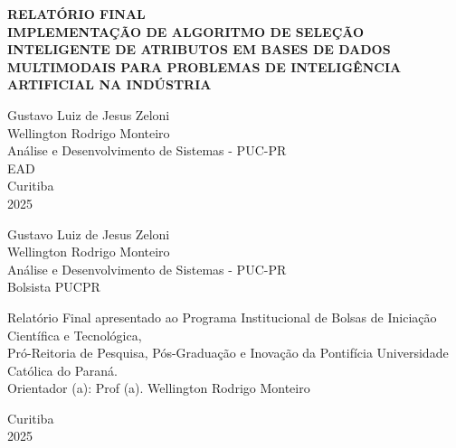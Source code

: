 \documentclass[12pt,openright,oneside,a4paper,english,brazil]{abntex2}
\begin{document}
\begin{capa}
    \cabecalhoinstitucional%

    \vspace{2cm}

    \begin{center}
        {\ABNTEXchapterfont\bfseries\LARGE RELATÓRIO FINAL}\\[1.5cm]
        {\ABNTEXchapterfont\bfseries\Large IMPLEMENTAÇÃO DE ALGORITMO DE SELEÇÃO INTELIGENTE DE ATRIBUTOS EM BASES DE DADOS MULTIMODAIS PARA PROBLEMAS DE INTELIGÊNCIA ARTIFICIAL NA INDÚSTRIA}\\[2cm]
    \end{center}

    \vfill

    \begin{flushright}
        {\large Gustavo Luiz de Jesus Zeloni}\\
        {\large Wellington Rodrigo Monteiro}\\
        {\large Análise e Desenvolvimento de Sistemas - PUC-PR}\\
        {\large EAD}\\[2cm]
        {\large Curitiba}\\
        {\large 2025}
    \end{flushright}
\end{capa}

\newpage
\thispagestyle{empty}
\cabecalhoinstitucional

\vspace{2cm}

\begin{center}
    {\large Gustavo Luiz de Jesus Zeloni}\\[0.3cm]
    {\large Wellington Rodrigo Monteiro}\\[0.3cm]
    {\large Análise e Desenvolvimento de Sistemas - PUC-PR}\\[0.3cm]
    {\large Bolsista PUCPR}\\[3cm]

    \vspace{1.5cm}

    \begin{flushright}
    \begin{minipage}{0.55\textwidth} %
        \footnotesize %
        Relatório Final apresentado ao Programa Institucional de Bolsas de Iniciação Científica e Tecnológica,\\
        Pró-Reitoria de Pesquisa, Pós-Graduação e Inovação da Pontifícia Universidade Católica do Paraná.\\[0.3cm]
        Orientador (a): Prof (a). Wellington Rodrigo Monteiro
    \end{minipage}
\end{flushright}

\vspace{2cm}

    {\large Curitiba}\\
    {\large 2025}
\end{center}
\end{document}
